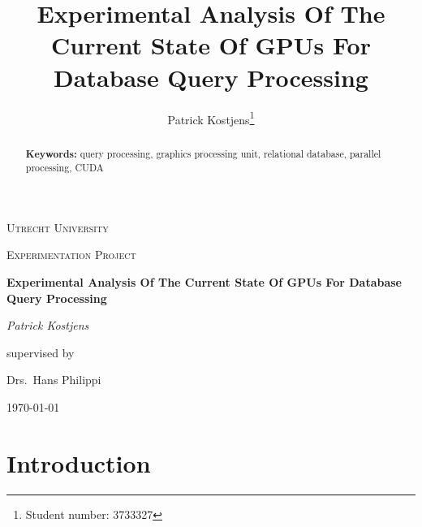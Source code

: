 \documentclass[a4paper,titlepage]{article}
\title{Experimental Analysis Of The Current State Of GPUs For Database Query Processing}
\author{Patrick Kostjens\thanks{Student number: 3733327}}
\date{}
\begin{document}
\begin{titlepage}
	\centering
	{\scshape\LARGE Utrecht University \par}
	\vspace{1cm}
	{\scshape\Large Experimentation Project \par}
	\vspace{1.5cm}
	{\huge\bfseries Experimental Analysis Of The Current State Of GPUs For Database Query Processing\par}
	\vspace{2cm}
	{\Large\itshape Patrick Kostjens\par}
	\vfill
	supervised by\par
	Drs.~Hans Philippi

	\vfill

	{\large \today\par}
\end{titlepage}

\begin{abstract}

\textbf{Keywords:} query processing, graphics processing unit, relational database, parallel processing, CUDA
\end{abstract}

\section{Introduction}



{}

\end{document}
